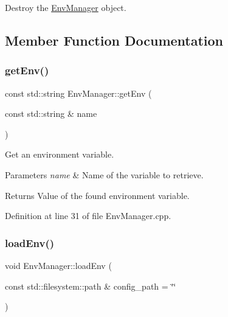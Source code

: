 Destroy the \hyperlink{classtls_1_1_env_manager}{Env\+Manager} object. 



\subsection{Member Function Documentation}
\mbox{\label{classtls_1_1_env_manager_a505529a47f05f2450594da617d627936}} 
\subsubsection{\texorpdfstring{get\+Env()}{getEnv()}}
{\footnotesize\ttfamily const std\+::string Env\+Manager\+::get\+Env (\begin{DoxyParamCaption}\item[{const std\+::string \&}]{name }\end{DoxyParamCaption})\hspace{0.3cm}{\ttfamily [static]}}



Get an environment variable. 


\begin{DoxyParams}{Parameters}
{\em name} & Name of the variable to retrieve.\\
\hline
\end{DoxyParams}
\begin{DoxyReturn}{Returns}
Value of the found environment variable. 
\end{DoxyReturn}


Definition at line 31 of file Env\+Manager.\+cpp.

\mbox{\label{classtls_1_1_env_manager_ad48562c6efa024230850b73d9d6361fb}} 
\subsubsection{\texorpdfstring{load\+Env()}{loadEnv()}}
{\footnotesize\ttfamily void Env\+Manager\+::load\+Env (\begin{DoxyParamCaption}\item[{const std\+::filesystem\+::path \&}]{config\+\_\+path = {\ttfamily \char`\"{}\char`\"{}} }\end{DoxyParamCaption})}



